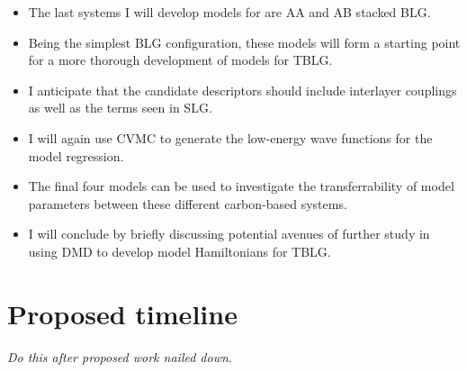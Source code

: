 \documentclass{article}
\begin{document}
\begin{itemize}
\item The last systems I will develop models for are AA and AB stacked BLG.

\item Being the simplest BLG configuration, these models will form a starting point for a more thorough development of models for TBLG.

\item I anticipate that the candidate descriptors should include interlayer couplings as well as the terms seen in SLG.

\item I will again use CVMC to generate the low-energy wave functions for the model regression.

\item The final four models can be used to investigate the transferrability of model parameters between these different carbon-based systems.

\item I will conclude by briefly discussing potential avenues of further study in using DMD to develop model Hamiltonians for TBLG. 

\end{itemize}
\section{Proposed timeline}
\textit{Do this after proposed work nailed down}.
\end{document}
